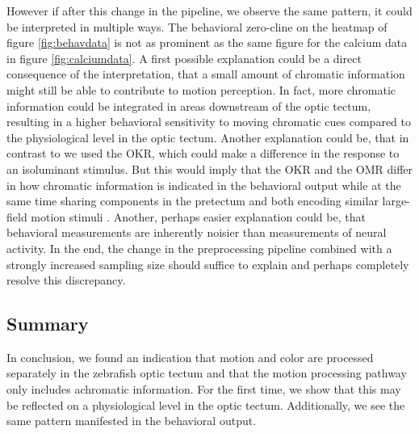 \vspace{\baselineskip}

However if after this change in the pipeline, we observe the same pattern, it could be interpreted in multiple ways. The behavioral zero-cline on the heatmap of figure \ref{fig:behavdata} is not as prominent as the same figure for the calcium data in figure \ref{fig:calciumdata}. A first possible explanation could be a direct consequence of the interpretation, that a small amount of chromatic information might still be able to contribute to motion perception. In fact, more chromatic information could be integrated in areas downstream of the optic tectum, resulting in a higher behavioral sensitivity to moving chromatic cues compared to the physiological level in the optic tectum. Another explanation could be, that in contrast to \textcite{orgerChannelingRedGreen2005} we used the OKR, which could make a difference in the response to an isoluminant stimulus. But this would imply that the OKR and the OMR differ in how chromatic information is indicated in the behavioral output while at the same time sharing components in the pretectum and both encoding similar large-field motion stimuli \parencite{wang2019selective, bollmannZebrafishVisualSystem2019}. Another, perhaps easier explanation could be, that behavioral measurements are inherently noisier than measurements of neural activity. In the end, the change in the preprocessing pipeline combined with a strongly increased sampling size should suffice to explain and perhaps completely resolve this discrepancy. 

\subsection{Summary}

In conclusion, we found an indication that motion and color are processed separately in the zebrafish optic tectum and that the motion processing pathway only includes achromatic information. For the first time, we show that this may be reflected on a physiological level in the optic tectum. Additionally, we see the same pattern manifested in the behavioral output. 
